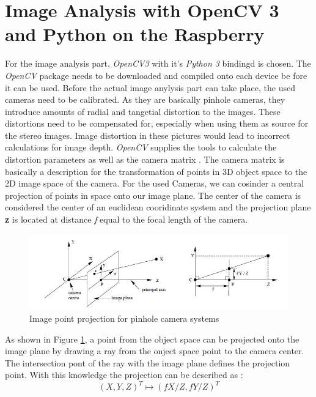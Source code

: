 \section{Image Analysis with OpenCV 3 and Python on the Raspberry}
For the image analysis part, \textit{OpenCV3} with it's \textit{Python 3} bindingd is chosen. The \textit{OpenCV} package needs to be downloaded and compiled onto each device be fore it can be used.
Before the actual image anylysis part can take place, the used cameras need to be calibrated. As they are basically pinhole cameras, they introduce amounts of radial and tangetial distortion to the images. These distortions need to be compensated for, especially when using them as source for the stereo images. Image distortion in these pictures would lead to incorrect calculations for image depth.
\textit{OpenCV} supplies the tools to calculate the distortion parameters as well as the camera matrix \cite{Opencv.2018}.
The camera matrix is basically a description for the transformation of points in 3D object space to the 2D image space of the camera. For the used Cameras, we can cosinder a central projection of points in space onto our image plane. The center of the camera is considered the center of an euclidean cooridinate system and the projection plane \textbf{z} is located at distance \textit{f} equal to the focal length of the camera.\\
\begin{figure}[H]
\includegraphics[width=\textwidth]{images/pionhole.JPG}
\caption{Image point projection for pinhole camera systems\cite{Hartley.2000}}
\label{pinholecamera_mapping} 
\end{figure}
As shown in Figure \ref{pinholecamera_mapping}, a point from the object space can be projected onto the image plane by drawing a ray from the onject space point to the camera center. The intersection pont of the ray with the image plane defines the projection point. With this knowledge the projection can be described as :
\begin{equation}
(X,Y,Z)^{T} \mapsto (fX/Z,fY/Z)^{T}
\end{equation}

